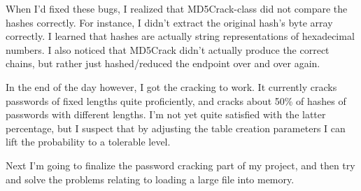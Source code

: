 \documentclass[a4paper, 11pt, finnish]{article}
\begin{document}
When I'd fixed these bugs, I realized that MD5Crack-class did not compare the hashes correctly. For instance, I didn't extract the original hash's byte array correctly. I learned that hashes are actually string representations of hexadecimal numbers. I also noticed that MD5Crack didn't actually produce the correct chains, but rather just hashed/reduced the endpoint over and over again.

In the end of the day however, I got the cracking to work. It currently cracks passwords of fixed lengths quite proficiently, and cracks about 50\% of hashes of passwords with different lengths. I'm not yet quite satisfied with the latter percentage, but I suspect that by adjusting the table creation parameters I can lift the probability to a tolerable level.

Next I'm going to finalize the password cracking part of my project, and then try and solve the problems relating to loading a large file into memory.
\end{document}
